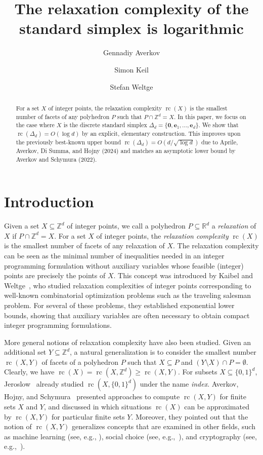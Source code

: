 \documentclass[11pt]{article}
\title{The relaxation complexity of the standard simplex is logarithmic}
\author[1]{Gennadiy Averkov}
\author[2]{Simon Keil}
\author[2]{Stefan Weltge}
\affil[1]{Brandenburg University of Technology Cottbus–Senftenberg}
\affil[2]{Technical University of Munich}
\date{}
\newcommand{\rc}{\operatorname{rc}}
\newcommand{\R}{\mathbb{R}}
\newcommand{\Z}{\mathbb{Z}}
\newcommand{\zero}{\mathbf{0}}
\newcommand{\unit}{\mathbf{e}}
\begin{document}
\maketitle

\begin{abstract}
    For a set $X$ of integer points, the relaxation complexity $\rc(X)$ is the smallest number of facets of any polyhedron $P$ such that $P \cap \Z^d = X$. In this paper, we focus on the case where $X$ is the discrete standard simplex $\Delta_d = \{\zero, \unit_1, \dots, \unit_d\}$. We show that $\rc(\Delta_d) = O(\log d)$ by an explicit, elementary construction.
    This improves upon the previously best-known upper bound $\rc(\Delta_d) = O(d / \sqrt{\log d})$ due to Aprile, Averkov, Di Summa, and Hojny (2024) and matches an asymptotic lower bound by Averkov and Schymura (2022).
\end{abstract}

\section{Introduction}
Given a set $X \subseteq \Z^d$ of integer points, we call a polyhedron $P \subseteq \R^d$ a \emph{relaxation} of $X$ if $P \cap \Z^d = X$. For a set $X$ of integer points, the \emph{relaxation complexity} $\rc(X)$ is the smallest number of facets of any relaxation of $X$. The relaxation complexity can be seen as the minimal number of inequalities needed in an integer programming formulation without auxiliary variables whose feasible (integer) points are precisely the points of $X$. This concept was introduced by Kaibel and Weltge~\cite{Kaibel2015, weltge2015sizes}, who studied relaxation complexities of integer points corresponding to well-known combinatorial optimization problems such as the traveling salesman problem.
For several of these problems, they established exponential lower bounds, showing that auxiliary variables are often necessary to obtain compact integer programming formulations.

More general notions of relaxation complexity have also been studied.
Given an additional set $Y \subseteq \Z^d$, a natural generalization is to consider the smallest number $\rc(X,Y)$ of facets of a polyhedron $P$ such that $X \subseteq P$ and $(Y \setminus X) \cap P = \emptyset$.
Clearly, we have $\rc(X) = \rc(X, \Z^d) \ge \rc(X,Y)$.
For subsets $X \subseteq \{0,1\}^d$, Jeroslow~\cite{Jeroslow1975} already studied $\rc(X,\{0,1\}^d)$ under the name \emph{index}.
Averkov, Hojny, and Schymura~\cite{Averkov2023a, Averkov2023b} presented approaches to compute $\rc(X,Y)$ for finite sets $X$ and $Y$, and discussed in which situations $\rc(X)$ can be approximated by $\rc(X,Y)$ for particular finite sets $Y$.
Moreover, they pointed out that the notion of $\rc(X,Y)$ generalizes concepts that are examined in other fields, such as machine learning (see, e.g., \cite{astorino2002polyhedral,baum1990learning,dundar2008polyhedral,manwani2010learning,orsenigo2007accurately}), social choice (see, e.g.,~\cite{kober2021improved,kurz2016dimension,taylor2008mathematics}), and cryptography (see, e.g.,~\cite{sun2014automatic, udovenko2021milp}).
\end{document}
